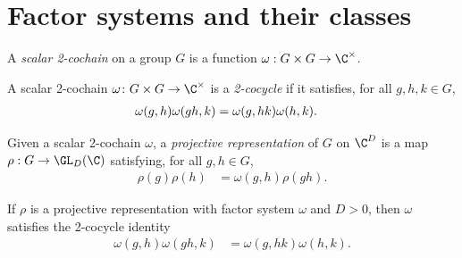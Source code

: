 \section{Factor systems and their classes}
\label{sec:projective_factor_systems}

\begin{definition}\label{def:scalar_cocycle}
    \leanok
    A \emph{scalar 2-cochain} on a group $G$ is a function
    $\omega : G \times G \to \C^{\times}$.
\end{definition}

\begin{definition}\label{def:is_cocycle}
    \leanok
    A scalar 2-cochain $\omega \colon G \times G \to \C^{\times}$ is a
    \emph{2-cocycle} if it satisfies, for all $g,h,k \in G$,
    \begin{align}
        \omega(g,h) \omega(gh,k)
         & =\omega(g,hk) \omega(h,k).
        \notag
    \end{align}
\end{definition}

\begin{definition}\label{def:projective_rep}
    \leanok
    Given a scalar 2-cochain $\omega$, a \emph{projective representation}
    of $G$ on $\C^D$ is a map $\rho : G \to \GL_{D}(\C)$ satisfying, for all
    $g,h \in G$,
    \begin{align}
        \rho(g) \rho(h)
         & =\omega(g,h) \rho(gh).
        \label{eq:symmetry_projective_law}
    \end{align}
\end{definition}

\begin{lemma}%
    \label{lem:cocycle_of_assoc}
    \leanok
    If $\rho$ is a projective representation with factor system $\omega$
    and $D > 0$, then $\omega$ satisfies the 2-cocycle identity
    \begin{align}
        \omega(g,h) \omega(gh,k)
         & =\omega(g,hk) \omega(h,k).
        \label{eq:symmetry_cocycle_identity}
    \end{align}
\end{lemma}

